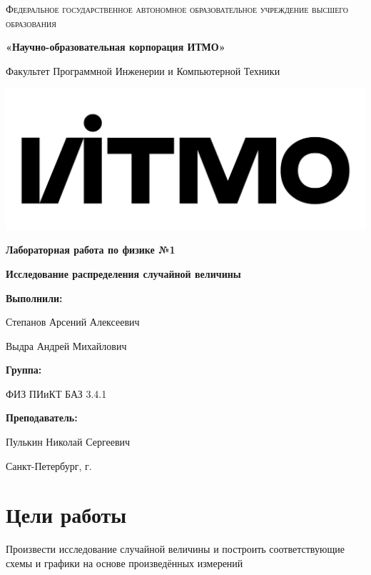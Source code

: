\documentclass[12pt,a4paper]{article}
\begin{document}
\begin{titlepage} 
	\centering
	{
        \scshape
        Федеральное государственное автономное образовательное учреждение высшего образования
        \par
        \textbf{«Научно-образовательная корпорация ИТМО»}
        \par
        \vspace*{1cm}
        Факультет Программной Инженерии и Компьютерной Техники
        \par
    }
    \vspace*{0.6cm}
    \includegraphics[width=\textwidth]{logo.png}
    {
        \Large
        \textbf{Лабораторная работа по физике №1}
        \par
        \normalsize
        \vspace*{0.75cm}
        \textbf{Исследование распределения случайной величины}
        \par
    }
    \vfill
    \hfill\begin{minipage}{\dimexpr\textwidth-7.8cm}
        \textbf{Выполнили:}\par
        Степанов Арсений Алексеевич\par
        Выдра Андрей Михайлович\par
        \vspace*{0.15cm}
        \textbf{Группа:}\par
        ФИЗ ПИиКТ БАЗ 3.4.1\par
        \vspace*{0.15cm}
        \textbf{Преподаватель:}\par
        Пулькин Николай Сергеевич\par
    \end{minipage}
    \vfill
    Санкт-Петербург, \the\year{}г.
\end{titlepage}  
\section{Цели работы}
Произвести исследование случайной величины и построить соответствующие схемы и графики на основе произведённых измерений
\end{document}
